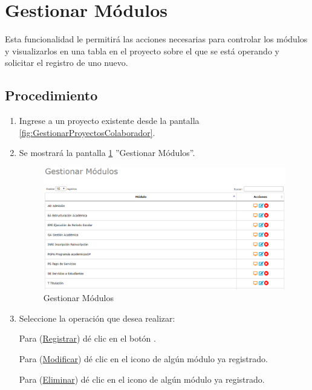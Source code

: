 \hypertarget{cv:GestionarModulos}{\section{Gestionar Módulos}} \label{sec:GestionarModulos}

	Esta funcionalidad le permitirá las acciones necesarias para controlar los módulos y visualizarlos en una tabla en el proyecto sobre el que se está operando y solicitar el registro de uno nuevo.

		\subsection{Procedimiento}

			\begin{enumerate}
				
			\item Ingrese a un proyecto existente desde la pantalla \ref{fig:GestionarProyectosColaborador}.
	
			\item Se mostrará la pantalla \ref{fig:GestionarModulos} ''Gestionar Módulos''.

			\begin{figure}[htbp!]
				\begin{center}
					\includegraphics[scale=0.6]{roles/lider/modulos/pantallas/IU5gestionarModulos}
					\caption{Gestionar Módulos}
					\label{fig:GestionarModulos}
				\end{center}
			\end{figure}
		
				\item Seleccione la operación que desea realizar:
			
			Para (\hyperlink{cv:registrarModulo}{Registrar}) dé clic en el botón \IURegistrar.
			
			Para (\hyperlink{cv:modificarModulo}{Modificar}) dé clic en el icono \IUEditar{} de algún módulo ya registrado.
			
			Para (\hyperlink{cv:eliminarModulo}{Eliminar}) dé clic en el icono \IUBotonEliminar{} de algún módulo ya registrado.
			
			
			\end{enumerate}